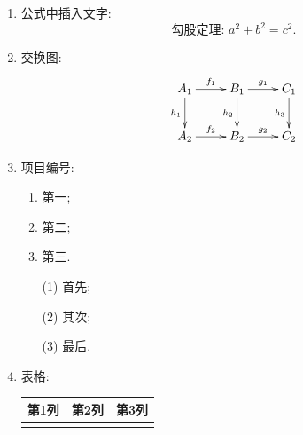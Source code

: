 \documentclass[a4paper, 11pt, UTF8]{article}
\theoremstyle{plain}
\theoremstyle{definition}
\theoremstyle{remark}
\begin{document}
\begin{enumerate}[1、]
		\item 公式中插入文字:
		\[ \text{勾股定理: } a^2+b^2=c^2. \]
		
		\item 交换图: 
		\[ \xymatrix{
		A_1 \ar[d]_{h_1} \ar[r]^{f_1} & \ar[d]_{h_2} B_1 \ar[r]^{g_1} & C_1 \ar[d]_{h_3} \\
		A_2 \ar[r]^{f_2} & B_2 \ar[r]^{g_2} & C_2} \]
		
		\item 项目编号:
		
		\begin{enumerate}[1、]
			\item 第一;
			\item 第二;
			\item 第三.
		\end{enumerate}
	
		\begin{enumerate}[1、]
			\item[(1)] 首先;
			\item[(2)] 其次;
			\item[(3)] 最后.
		\end{enumerate}
	
		\item 表格:
		\begin{center}
			\begin{tabular}{*{3}{|m{3cm}<{\centering}}|}
				\hline
				\textbf{第1列}	& \textbf{第2列} & \textbf{第3列} \\
				\hline
				&  &  \\
				\hline
			\end{tabular}
		\end{center}
	

\end{enumerate}
\end{document}
